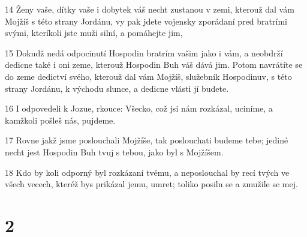 \par 14 Ženy vaše, dítky vaše i dobytek váš necht zustanou v zemi, kterouž dal vám Mojžíš s této strany Jordánu, vy pak jdete vojensky zporádaní pred bratrími svými, kteríkoli jste muži silní, a pomáhejte jim,
\par 15 Dokudž nedá odpocinutí Hospodin bratrím vašim jako i vám, a neobdrží dedicne také i oni zeme, kterouž Hospodin Buh váš dává jim. Potom navrátíte se do zeme dedictví svého, kterouž dal vám Mojžíš, služebník Hospodinuv, s této strany Jordánu, k východu slunce, a dedicne vlásti jí budete.
\par 16 I odpovedeli k Jozue, rkouce: Všecko, což jsi nám rozkázal, uciníme, a kamžkoli pošleš nás, pujdeme.
\par 17 Rovne jakž jsme poslouchali Mojžíše, tak poslouchati budeme tebe; jediné necht jest Hospodin Buh tvuj s tebou, jako byl s Mojžíšem.
\par 18 Kdo by koli odporný byl rozkázaní tvému, a neposlouchal by recí tvých ve všech vecech, kteréž bys prikázal jemu, umret; toliko posiln se a zmužile se mej.

\chapter{2}

